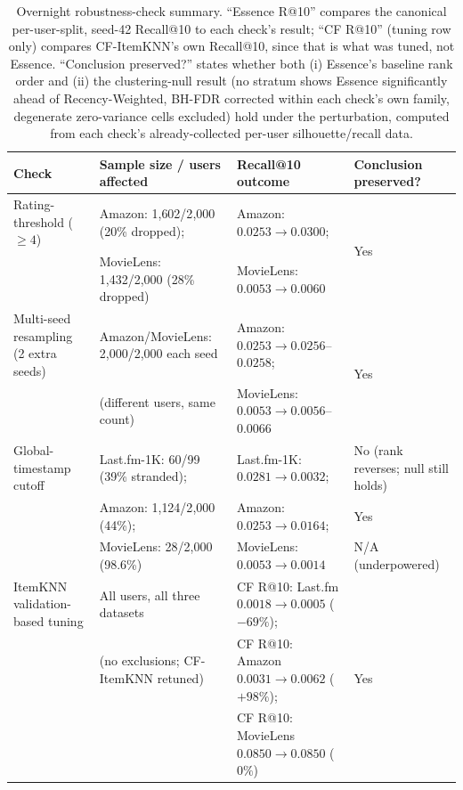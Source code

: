 \documentclass[11pt,a4paper]{article}
\begin{document}
\begin{table}[H]
\centering
\caption{Overnight robustness-check summary. ``Essence R@10'' compares
         the canonical per-user-split, seed-42 Recall@10 to each
         check's result; ``CF R@10'' (tuning row only) compares
         CF-ItemKNN's own Recall@10, since that is what was tuned, not
         Essence. ``Conclusion preserved?'' states whether both (i)
         Essence's baseline rank order and (ii) the clustering-null
         result (no stratum shows Essence significantly ahead of
         Recency-Weighted, BH-FDR corrected within each check's own
         family, degenerate zero-variance cells excluded) hold under
         the perturbation, computed from each check's already-collected
         per-user silhouette/recall data.}
\label{tab:robustness}
\small
\begin{tabular}{llll}
\toprule
\textbf{Check} & \textbf{Sample size / users affected} & \textbf{Recall@10 outcome} & \textbf{Conclusion preserved?} \\
\midrule
Rating-threshold ($\geq 4$) & Amazon: 1{,}602/2{,}000 (20\% dropped); & Amazon: $0.0253\to0.0300$; & \multirow{2}{*}{Yes} \\
 & MovieLens: 1{,}432/2{,}000 (28\% dropped) & MovieLens: $0.0053\to0.0060$ & \\
\midrule
Multi-seed resampling (2 extra seeds) & Amazon/MovieLens: 2{,}000/2{,}000 each seed & Amazon: $0.0253\to0.0256$--$0.0258$; & \multirow{2}{*}{Yes} \\
 & (different users, same count) & MovieLens: $0.0053\to0.0056$--$0.0066$ & \\
\midrule
Global-timestamp cutoff & Last.fm-1K: 60/99 (39\% stranded); & Last.fm-1K: $0.0281\to0.0032$; & No (rank reverses; null still holds) \\
 & Amazon: 1{,}124/2{,}000 (44\%); & Amazon: $0.0253\to0.0164$; & Yes \\
 & MovieLens: 28/2{,}000 (98.6\%) & MovieLens: $0.0053\to0.0014$ & N/A (underpowered) \\
\midrule
ItemKNN validation-based tuning & All users, all three datasets & CF R@10: Last.fm $0.0018\to0.0005$ ($-69\%$); & \multirow{3}{*}{Yes} \\
 & (no exclusions; CF-ItemKNN retuned) & CF R@10: Amazon $0.0031\to0.0062$ ($+98\%$); & \\
 & & CF R@10: MovieLens $0.0850\to0.0850$ ($0\%$) & \\
\bottomrule
\end{tabular}
\end{table}
\end{document}
